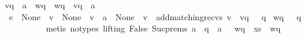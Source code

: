 \begin{isabellebody}
{\isasymnot}{\isacharparenleft}{\kern0pt}{\isacharparenleft}{\kern0pt}{\isacharquery}{\kern0pt}v{\isacharprime}{\kern0pt}{\isasymdown}\isactrlsub q\ {\isasymsqdot}\ {\isacharbrackleft}{\kern0pt}a{\isacharbrackright}{\kern0pt}{\isacharparenright}{\kern0pt}\ {\isasymsqunion}{\isasymsqunion}\isactrlsub {\isacharquery}{\kern0pt}\ {\isacharquery}{\kern0pt}wq{\isacharparenright}{\kern0pt}\ {\isasymand}\ {\isacharquery}{\kern0pt}wq\ {\isasymnoteq}\ {\isacharparenleft}{\kern0pt}{\isacharquery}{\kern0pt}v{\isacharprime}{\kern0pt}{\isasymdown}\isactrlsub q\ {\isasymsqdot}\ {\isacharbrackleft}{\kern0pt}a{\isacharbrackright}{\kern0pt}{\isacharparenright}{\kern0pt}\isanewline
{\isasymand}\ e\ {\isasymin}\ {\isasymT}\isactrlbsub None\isactrlesub \ {\isasymand}\ {\isacharquery}{\kern0pt}v{\isacharprime}{\kern0pt}\ {\isasymin}\ {\isasymT}\isactrlbsub None\isactrlesub \ {\isasymand}\ {\isacharparenleft}{\kern0pt}v\ {\isasymsqdot}\ {\isacharbrackleft}{\kern0pt}a{\isacharbrackright}{\kern0pt}{\isacharparenright}{\kern0pt}\ {\isasymin}\ {\isasymT}\isactrlbsub None\isactrlesub {\isasymdownharpoonright}\isactrlsub {\isacharbang}{\kern0pt}\ {\isasymand}\ {\isacharquery}{\kern0pt}v{\isacharprime}{\kern0pt}\ {\isacharequal}{\kern0pt}\ {\isacharparenleft}{\kern0pt}add{\isacharunderscore}{\kern0pt}matching{\isacharunderscore}{\kern0pt}recvs\ v{\isacharparenright}{\kern0pt}\ {\isasymand}\ {\isacharquery}{\kern0pt}v{\isacharprime}{\kern0pt}{\isasymdown}\isactrlsub q\ {\isasymin}\ {\isasymL}\isactrlsup {\isacharasterisk}{\kern0pt}\ q\isanewline
{\isasymand}\ {\isacharquery}{\kern0pt}wq\ {\isasymin}\ {\isasymL}\isactrlsup {\isacharasterisk}{\kern0pt}\ q{\isachardoublequoteclose}\ \isanewline
\ \ \ \ \ \ \ \ \isamarkupfalse%
\ {\isacharparenleft}{\kern0pt}metis\ {\isacharparenleft}{\kern0pt}no{\isacharunderscore}{\kern0pt}types{\isacharcomma}{\kern0pt}\ lifting{\isacharparenright}{\kern0pt}\ False\ Suc{\isachardot}{\kern0pt}prems{\isacharparenleft}{\kern0pt}{}{\isacharparenright}{\kern0pt}\ {\isacartoucheopen}{\isacharparenleft}{\kern0pt}a\ {\isacharhash}{\kern0pt}\ {\isasymepsilon}{\isacharparenright}{\kern0pt}{\isasymdown}\isactrlsub q\ {\isacharequal}{\kern0pt}\ a\ {\isacharhash}{\kern0pt}\ {\isasymepsilon}{\isacartoucheclose}\ {\isacartoucheopen}{\isacharparenleft}{\kern0pt}wq\ {\isasymsqdot}\ xs{\isacharparenright}{\kern0pt}{\isasymdown}\isactrlsub {\isacharbang}{\kern0pt}\ {\isacharequal}{\kern0pt}\ wq{\isasymdown}\isactrlsub {\isacharbang}{\kern0pt}{\isacartoucheclose}\isanewline

\end{isabellebody}

